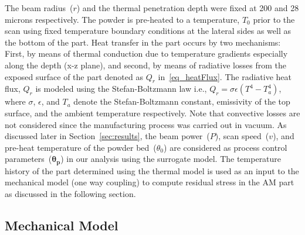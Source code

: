 The beam radius~($r$) and the thermal penetration depth were fixed at 200 and 28
microns respectively. The powder is pre-heated to a temperature, $T_0$ prior to the scan using fixed temperature
boundary conditions at the lateral sides as well as the bottom of the part. Heat transfer in the part occurs by two
mechanisms: First, by means of thermal conduction due to temperature gradients especially along the depth (x-z plane),
and second, by means of radiative losses from the exposed surface of the part denoted as $Q_r$ in~\eqref{eq_heatFlux}.
The radiative heat flux, $Q_r$ is modeled using the Stefan-Boltzmann law i.e., $Q_r=\sigma\epsilon(T^4-T_a^4)$, where
$\sigma$, $\epsilon$, and $T_a$ denote the Stefan-Boltzmann constant, emissivity of the top surface, and the ambient
temperature respectively. Note that convective losses are not considered since the manufacturing process was
carried out in vacuum. As discussed later in Section~\ref{sec:results}, the beam power~($P$), scan speed~($v$), and 
pre-heat temperature of the powder bed~($\theta_0$) are considered as process control parameters~($\bm{\theta_p}$)
in our analysis using the surrogate model. The temperature history of the part determined using the thermal model
is used as an input to the mechanical model (one way coupling) to compute residual stress in the AM part as 
discussed in the following section. 

\subsection{Mechanical Model}
\label{sub:mech}

